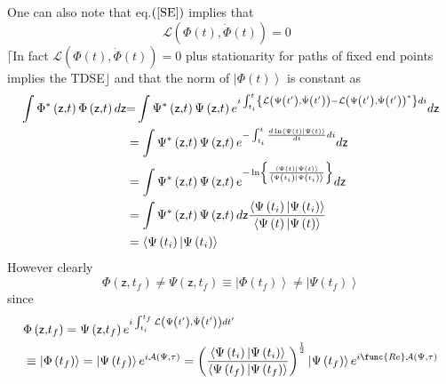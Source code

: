 \documentclass[aps,preprint]{revtex4}
\begin{document}
One can also note that eq.$\left( \ref{SE}\right) $ implies that 
\begin{equation}
\mathcal{L}\left( \Phi\left( t\right) ,\dot{\Phi}\left( t\right) \right) =0%
\text{ }
\end{equation}
$\lceil$In fact $\mathcal{L}\left( \Phi\left( t\right) ,\dot{\Phi}\left(
t\right) \right) =0$ plus stationarity for paths of fixed end points implies
the TDSE$\rfloor$ and that the norm of $\left| \Phi\left( t\right)
\right\rangle $ is constant as 
\begin{align}
\int\Phi^{\ast}\left( \mathsf{z,}t\right) \Phi\left( \mathsf{z,}t\right) d%
\mathsf{z} & \mathsf{=}\int\Psi^{\ast}\left( \mathsf{z,}t\right) \Psi\left( 
\mathsf{z,}t\right) e^{i\int_{t_{i}}^{t}\left\{ \mathcal{L}\left( \Psi\left(
t^{\prime}\right) ,\dot{\Psi}\left( t^{\prime}\right) \right) -\mathcal{L}%
\left( \Psi\left( t^{\prime}\right) ,\dot{\Psi}\left( t^{\prime}\right)
\right) ^{\ast}\right\} di}d\mathsf{z}  \notag \\
& =\int\Psi^{\ast}\left( \mathsf{z,}t\right) \Psi\left( \mathsf{z,}t\right)
e^{-\int_{t_{i}}^{t}\frac{d\ln\left\langle \Psi\left( t\right) |\Psi\left(
t\right) \right\rangle }{dt}di}d\mathsf{z}  \notag \\
& =\int\Psi^{\ast}\left( \mathsf{z,}t\right) \Psi\left( \mathsf{z,}t\right)
e^{-\ln\left\{ \frac{\left\langle \Psi\left( t\right) |\Psi\left( t\right)
\right\rangle }{\left\langle \Psi\left( t_{i}\right) |\Psi\left(
t_{i}\right) \right\rangle }\right\} }d\mathsf{z}  \notag \\
& =\int\Psi^{\ast}\left( \mathsf{z,}t\right) \Psi\left( \mathsf{z,}t\right) d%
\mathsf{z}\frac{\left\langle \Psi\left( t_{i}\right) |\Psi\left(
t_{i}\right) \right\rangle }{\left\langle \Psi\left( t\right) |\Psi\left(
t\right) \right\rangle }  \notag \\
& =\left\langle \Psi\left( t_{i}\right) |\Psi\left( t_{i}\right)
\right\rangle
\end{align}
However clearly 
\begin{equation}
\Phi\left( \mathsf{z,}t_{f}\right) \neq\Psi\left( \mathsf{z,}t_{f}\right)
\equiv\left| \Phi\left( t_{f}\right) \right\rangle \neq\left| \Psi\left(
t_{f}\right) \right\rangle
\end{equation}
since 
\begin{align}
& \Phi\left( \mathsf{z,}t_{f}\right) =\Psi\left( \mathsf{z,}t_{f}\right)
e^{i\int_{t_{i}}^{t_{f}}\mathcal{L}\left( \Psi\left( t^{\prime}\right) ,\dot{%
\Psi}\left( t^{\prime}\right) \right) dt^{\prime}} \\
& \left. \equiv\right. \left| \Phi\left( t_{f}\right) \right\rangle =\left|
\Psi\left( t_{f}\right) \right\rangle e^{i\mathcal{A}\left( \Psi,\tau\right)
}=\left( \frac{\left\langle \Psi\left( t_{i}\right) |\Psi\left( t_{i}\right)
\right\rangle }{\left\langle \Psi\left( t_{f}\right) |\Psi\left(
t_{f}\right) \right\rangle }\right) ^{\frac{1}{2}}\left| \Psi\left(
t_{f}\right) \right\rangle e^{i\func{Re}\mathcal{A}\left( \Psi,\tau\right) }
\end{align}
\end{document}
